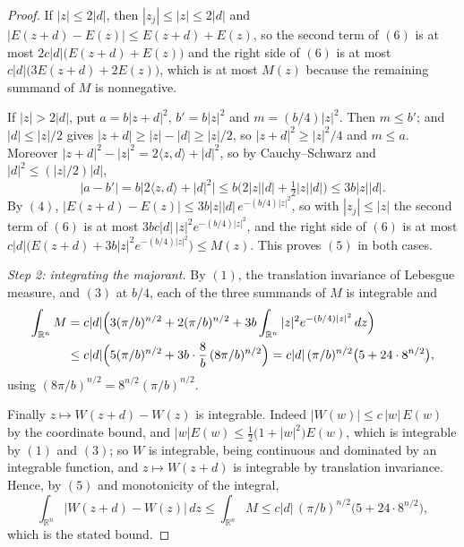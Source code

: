 \begin{proof}
If $|z| \leq 2|d|$, then $|z_j| \leq |z| \leq 2|d|$ and
$|E(z+d)-E(z)| \leq E(z+d)+E(z)$, so the second term of $(6)$ is at most
$2c|d|\bigl(E(z+d)+E(z)\bigr)$ and the right side of $(6)$ is at most
$c|d|\bigl(3E(z+d)+2E(z)\bigr)$, which is at most $M(z)$ because the remaining
summand of $M$ is nonnegative.

If $|z| > 2|d|$, put $a = b|z+d|^2$, $b' = b|z|^2$ and $m = (b/4)|z|^2$.  Then
$m \leq b'$; and $|d| \leq |z|/2$ gives $|z+d| \geq |z|-|d| \geq |z|/2$, so
$|z+d|^2 \geq |z|^2/4$ and $m \leq a$.  Moreover
$|z+d|^2 - |z|^2 = 2\langle z,d\rangle + |d|^2$, so by Cauchy--Schwarz and
$|d|^2 \leq (|z|/2)|d|$,
\[
  |a-b'| = b\bigl|2\langle z,d\rangle+|d|^2\bigr|
    \leq b\bigl(2|z||d| + \tfrac12|z||d|\bigr) \leq 3b|z||d| .
\]
By $(4)$, $|E(z+d)-E(z)| \leq 3b|z||d|\,e^{-(b/4)|z|^2}$, so with
$|z_j| \leq |z|$ the second term of $(6)$ is at most
$3bc|d|\,|z|^2e^{-(b/4)|z|^2}$, and the right side of $(6)$ is at most
$c|d|\bigl(E(z+d) + 3b|z|^2e^{-(b/4)|z|^2}\bigr) \leq M(z)$.  This proves $(5)$
in both cases.

\emph{Step 2: integrating the majorant.}
By $(1)$, the translation invariance of Lebesgue measure, and $(3)$ at $b/4$,
each of the three summands of $M$ is integrable and
\begin{align*}
  \int_{\mathbb{R}^n} M
    &= c|d|\Bigl(3(\pi/b)^{n/2} + 2(\pi/b)^{n/2}
        + 3b\int_{\mathbb{R}^n}|z|^2e^{-(b/4)|z|^2}\,dz\Bigr)\\
    &\leq c|d|\Bigl(5(\pi/b)^{n/2} + 3b\cdot\frac8b\,(8\pi/b)^{n/2}\Bigr)
     = c|d|\,(\pi/b)^{n/2}\bigl(5+24\cdot8^{n/2}\bigr) ,
\end{align*}
using $(8\pi/b)^{n/2} = 8^{n/2}(\pi/b)^{n/2}$.

Finally $z \mapsto W(z+d)-W(z)$ is integrable.  Indeed $|W(w)| \leq c\,|w|\,E(w)$
by the coordinate bound, and $|w|E(w) \leq \tfrac12\bigl(1+|w|^2\bigr)E(w)$, which
is integrable by $(1)$ and $(3)$; so $W$ is integrable, being continuous and
dominated by an integrable function, and $z \mapsto W(z+d)$ is integrable by
translation invariance.  Hence, by $(5)$ and monotonicity of the integral,
\[
  \int_{\mathbb{R}^n}\bigl|W(z+d)-W(z)\bigr|\,dz
    \leq \int_{\mathbb{R}^n} M
    \leq c|d|\,(\pi/b)^{n/2}\bigl(5+24\cdot8^{n/2}\bigr) ,
\]
which is the stated bound.
\end{proof}
